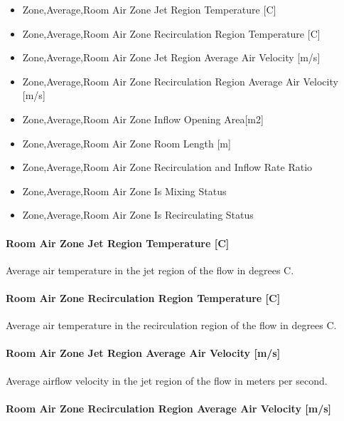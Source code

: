 \begin{itemize}
\item
  Zone,Average,Room Air Zone Jet Region Temperature {[}C{]}
\item
  Zone,Average,Room Air Zone Recirculation Region Temperature {[}C{]}
\item
  Zone,Average,Room Air Zone Jet Region Average Air Velocity {[}m/s{]}
\item
  Zone,Average,Room Air Zone Recirculation Region Average Air Velocity {[}m/s{]}
\item
  Zone,Average,Room Air Zone Inflow Opening Area{[}m2{]}
\item
  Zone,Average,Room Air Zone Room Length {[}m{]}
\item
  Zone,Average,Room Air Zone Recirculation and Inflow Rate Ratio
\item
  Zone,Average,Room Air Zone Is Mixing Status
\item
  Zone,Average,Room Air Zone Is Recirculating Status
\end{itemize}

\paragraph{Room Air Zone Jet Region Temperature {[}C{]}}\label{room-air-zone-jet-region-temperature-c-1}

Average air temperature in the jet region of the flow in degrees C.

\paragraph{Room Air Zone Recirculation Region Temperature {[}C{]}}\label{room-air-zone-recirculation-region-temperature-c-1}

Average air temperature in the recirculation region of the flow in degrees C.

\paragraph{Room Air Zone Jet Region Average Air Velocity {[}m/s{]}}\label{room-air-zone-jet-region-average-air-velocity-ms-1}

Average airflow velocity in the jet region of the flow in meters per second.

\paragraph{Room Air Zone Recirculation Region Average Air Velocity {[}m/s{]}}\label{room-air-zone-recirculation-region-average-air-velocity-ms-1}

